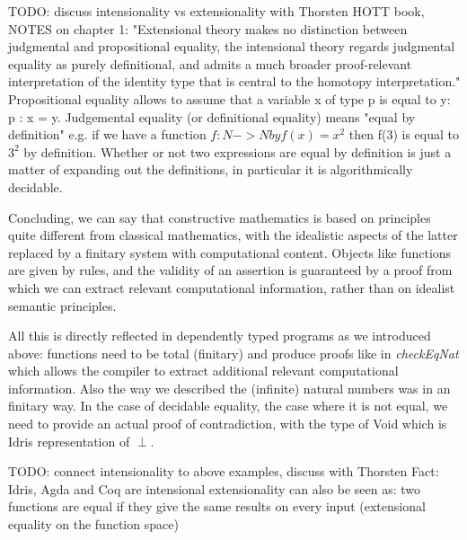 TODO: discuss intensionality vs extensionality with Thorsten
HOTT book, NOTES on chapter 1: "Extensional theory makes no distinction between judgmental and propositional equality, the intensional theory regards judgmental equality as purely definitional, and admits a much broader proof-relevant interpretation of the identity type that is central to the homotopy interpretation."
Propositional equality allows to assume that a variable x of type p is equal to y: p : x = y.
Judgemental equality (or definitional equality) means "equal by definition" e.g. if we have a function $f : N -> N by f(x) = x^2$ then f(3) is equal to $3^2$ by definition. Whether or not two expressions are equal by definition is just a matter of expanding out the definitions, in particular it is algorithmically decidable.

Concluding, we can say that constructive mathematics is based on principles quite different from classical mathematics, with the idealistic aspects of the latter replaced by a finitary system with computational content. Objects like functions are given by rules, and the validity of an assertion is guaranteed by a proof from which we can extract relevant computational information, rather than on idealist semantic principles. 

All this is directly reflected in dependently typed programs as we introduced above: functions need to be total (finitary) and produce proofs like in \textit{checkEqNat} which allows the compiler to extract additional relevant computational information. Also the way we described the (infinite) natural numbers was in an finitary way. In the case of decidable equality, the case where it is not equal, we need to provide an actual proof of contradiction, with the type of Void which is Idris representation of $\perp$. 

TODO: connect intensionality to above examples, discuss with Thorsten
Fact: Idris, Agda and Coq are intensional
extensionality can also be seen as: two functions are equal if they give the same results on every input (extensional equality on the function space)